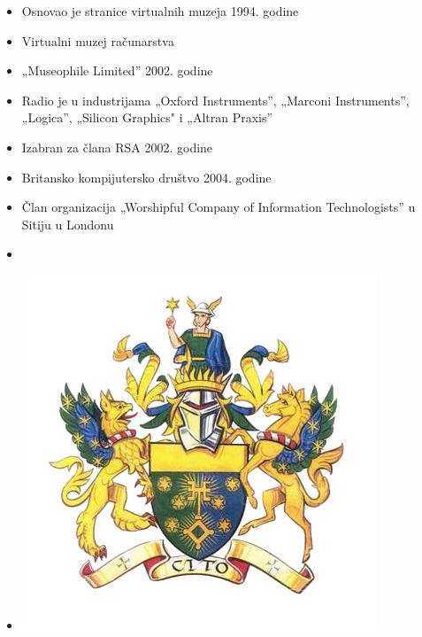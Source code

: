 \documentclass{beamer}
\begin{document}
\begin{frame}
\begin{itemize}
		\item Osnovao je stranice virtualnih muzeja 1994. godine
		\item Virtualni muzej računarstva 
		\item „Museophile Limited” 2002. godine
		\item  Radio je u industrijama „Oxford Instruments”, „Marconi Instruments”, „Logica”, „Silicon Graphics" i „Altran Praxis”
		    \end{itemize}
\end{frame}
\begin{frame}
\begin{itemize}
		\item Izabran za člana RSA 2002. godine
		\item Britansko kompijutersko društvo 2004. godine
		\item Član organizacija „Worshipful Company of Information Technologists”  u Sitiju  u Londonu
		\item[]
		\item[] \begin{center} \includegraphics[scale=0.25]{7Nb1Hw2A_400x400.jpg} \end{center}
	
		    \end{itemize}
\end{frame}

		
\end{document}
